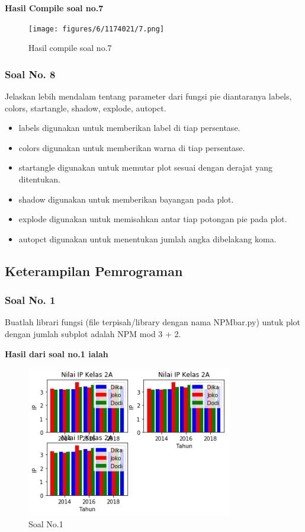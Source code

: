 

\hfill \break
\textbf{Hasil Compile soal no.7}

\begin{figure}[H]
	\texttt{[image: figures/6/1174021/7.png]}
	\centering
	\caption{Hasil compile soal no.7}
\end{figure}

\subsubsection{Soal No. 8}
\hfill \break
 Jelaskan lebih mendalam tentang parameter dari fungsi pie diantaranya labels, colors, startangle, shadow, explode, autopct.
 
 \begin{itemize}
 	\item labels digunakan untuk memberikan label di tiap persentase.
 	\item colors digunakan untuk memberikan warna di tiap persentase.
 	\item startangle digunakan untuk memutar plot sesuai dengan derajat yang ditentukan.
 	\item shadow digunakan untuk memberikan bayangan pada plot.
 	\item explode digunakan untuk memisahkan antar tiap potongan pie pada plot.
 	\item autopct digunakan untuk menentukan jumlah angka dibelakang koma.
 \end{itemize}
 
 
 
\subsection{Keterampilan Pemrograman}
\subsubsection{Soal No. 1}
\hfill \break
Buatlah librari fungsi (file terpisah/library dengan nama NPMbar.py) untuk plot dengan jumlah subplot adalah NPM mod 3 + 2.



\hfill \break
\textbf{Hasil dari soal no.1 ialah}

\begin{figure}[H]
	\includegraphics[width=9cm]{figures/6/1174021/p1.png}
	\centering
	\caption{Soal No.1}
\end{figure}


